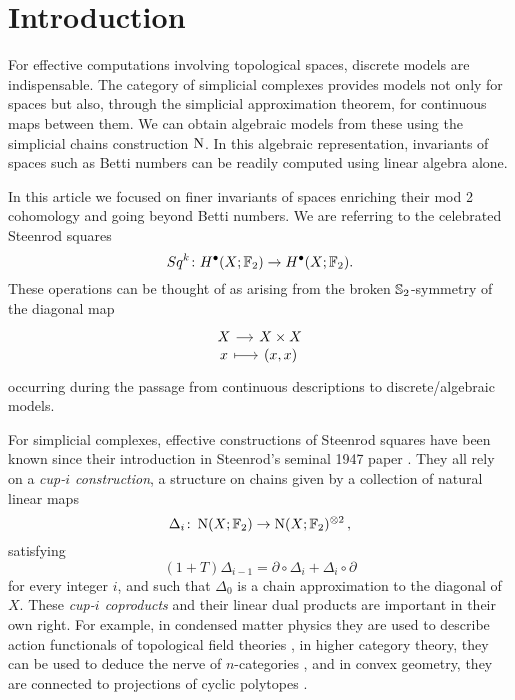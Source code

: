
\section{Introduction}

For effective computations involving topological spaces, discrete models are indispensable.
The category of simplicial complexes provides models not only for spaces but also, through the simplicial approximation theorem, for continuous maps between them.
We can obtain algebraic models from these using the simplicial chains construction $\chains$.
In this algebraic representation, invariants of spaces such as Betti numbers can be readily computed using linear algebra alone.

In this article we focused on finer invariants of spaces enriching their mod 2 cohomology and going beyond Betti numbers.
We are referring to the celebrated Steenrod squares
\begin{equation*}
Sq^k \colon H^\bullet(X; \Ftwo) \to H^\bullet(X; \Ftwo).
\end{equation*}
These operations can be thought of as arising from the broken $\S_2$-symmetry of the diagonal map
\begin{equation*}
\begin{tikzcd}[column sep=small, row sep=-3pt]
X \arrow[r] & X \times X \\
x \arrow[r, mapsto] & (x,x)
\end{tikzcd}
\end{equation*}
occurring during the passage from continuous descriptions to discrete/algebraic models.

For simplicial complexes, effective constructions of Steenrod squares have been known since their introduction in Steenrod's seminal 1947 paper \cite{steenrod1947products}.
They all rely on a \textit{cup-$i$ construction}, a structure on chains given by a collection of natural linear maps
\begin{equation*}
\Delta_i \colon \chains(X; \Ftwo)  \to \chains(X; \Ftwo)^{\otimes 2}\,,
\end{equation*}
satisfying
\begin{equation*}
(1+T) \Delta_{i-1} = \partial \circ \Delta_i + \Delta_i \circ \partial
\end{equation*}
for every integer $i$, and such that $\Delta_0$ is a chain approximation to the diagonal of $X$.
These \textit{cup-$i$ coproducts} and their linear dual products are important in their own right.
For example, in condensed matter physics they are used to describe action functionals of topological field theories \cite{gaiotto2016spin, bhardwaj2017state, kapustin2017fermionic}, in higher category theory, they can be used to deduce the nerve of $n$-categories \cite{medina2020globular}, and in convex geometry, they are connected to projections of cyclic polytopes \cite{kapranov1991combinatorial}.

